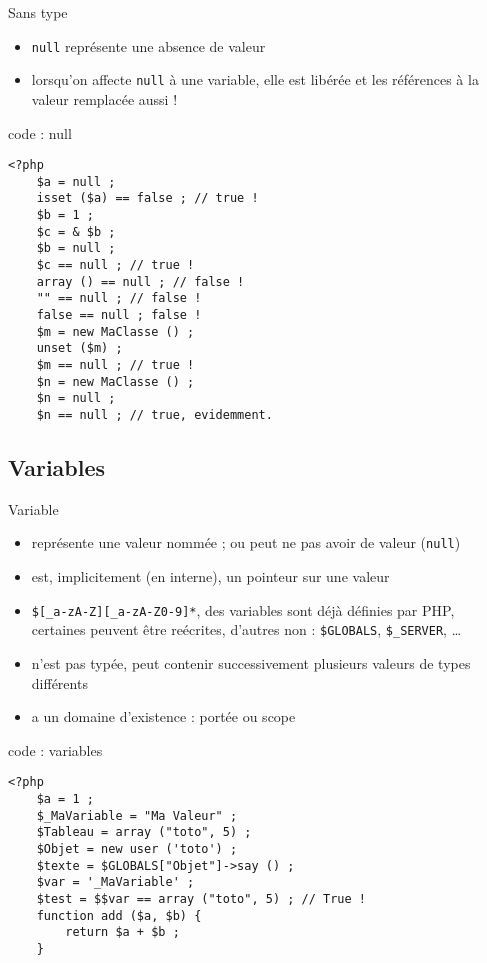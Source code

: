 \begin{frame}[containsverbatim]{Sans type}
	\begin{itemize}
		\item \texttt{null} représente une absence de valeur
		\item lorsqu'on affecte \texttt{null} à une variable, elle est libérée et les références à la valeur remplacée aussi !
	\end{itemize}
	\begin{block}{code : null}
		\begin{lstlisting}
<?php
	$a = null ;
	isset ($a) == false ; // true !
	$b = 1 ;
	$c = & $b ;
	$b = null ;
	$c == null ; // true !
	array () == null ; // false !
	"" == null ; // false !
	false == null ; false !
	$m = new MaClasse () ;
	unset ($m) ;
	$m == null ; // true !
	$n = new MaClasse () ;
	$n = null ;
	$n == null ; // true, evidemment.
		\end{lstlisting}
	\end{block}
\end{frame}

\subsection{Variables}

\begin{frame}[containsverbatim]{Variable}
	\begin{itemize}
		\item représente une valeur nommée ; ou peut ne pas avoir de valeur (\texttt{null})
		\item est, implicitement (en interne), un pointeur sur une valeur
		\item \texttt{\$[\_a-zA-Z][\_a-zA-Z0-9]*}, des variables sont déjà définies par PHP, certaines peuvent être reécrites, d'autres non : \texttt{\$GLOBALS}, \texttt{\$\_SERVER}, \ldots
		\item n'est pas typée, peut contenir successivement plusieurs valeurs de types différents
		\item a un domaine d'existence : portée ou scope
	\end{itemize}
	\begin{block}{code : variables}
		\begin{lstlisting}
<?php
	$a = 1 ;
	$_MaVariable = "Ma Valeur" ;
	$Tableau = array ("toto", 5) ;
	$Objet = new user ('toto') ;
	$texte = $GLOBALS["Objet"]->say () ;
	$var = '_MaVariable' ;
	$test = $$var == array ("toto", 5) ; // True !
	function add ($a, $b) {
		return $a + $b ;
	}
		\end{lstlisting}
	\end{block}
\end{frame}

